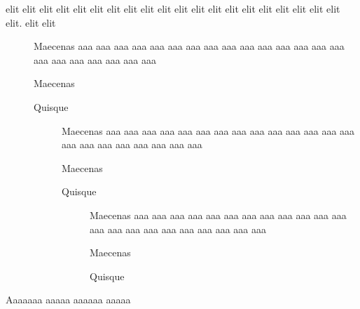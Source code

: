 \documentclass{article}
\begin{document}
\bigskip
\bigskip



\noindent elit elit  elit elit elit elit elit elit elit elit elit elit elit elit elit elit elit elit elit elit elit. elit elit
\begin{description}
	\item[] Maecenas aaa aaa aaa aaa aaa aaa aaa aaa aaa aaa aaa aaa aaa aaa aaa aaa aaa aaa aaa aaa aaa aaa
	\item[] Maecenas
	\item[] Quisque
	\begin{description}
		\item[] Maecenas aaa aaa aaa aaa aaa aaa aaa aaa aaa aaa aaa aaa aaa aaa aaa aaa aaa aaa aaa aaa aaa aaa 
		\item[] Maecenas 
		\item[] Quisque
		\begin{description}
			\item[] Maecenas aaa aaa aaa aaa aaa aaa aaa aaa aaa aaa aaa aaa aaa aaa aaa aaa aaa aaa aaa aaa aaa aaa
			\item[] Maecenas
			\item[] Quisque
		\end{description}
	\end{description}
\end{description}
Aaaaaaa aaaaa aaaaaa aaaaa
\end{document}

